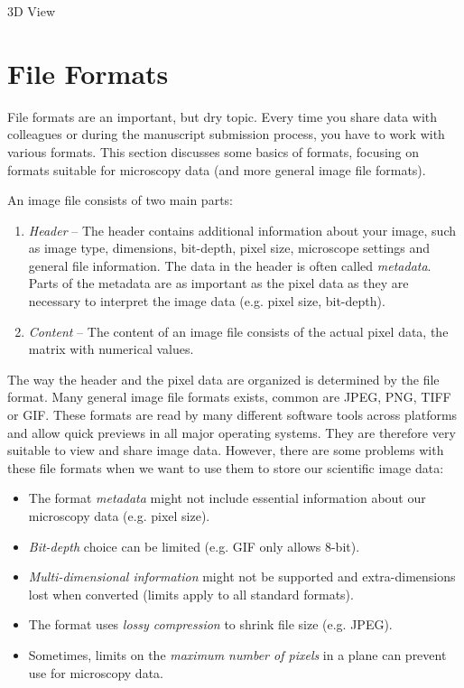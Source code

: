 \begin{taskbox}{3D View}
\end{taskbox}

\section{File Formats}
File formats are an important, but dry topic. Every time you share data with colleagues or during the manuscript submission process, you have to work with various formats. This section discusses some basics of formats, focusing on formats suitable for microscopy data (and more general image file formats).

An image file consists of two main parts:
\begin{enumerate}
	\item \emph{Header} -- The header contains additional information about your image, such as image type, dimensions, bit-depth, pixel size, microscope settings and general file information. The data in the header is often called \emph{metadata}. Parts of the metadata are as important as the pixel data as they are necessary to interpret the image data (e.g. pixel size, bit-depth). 
	\item \emph{Content} -- The content of an image file consists of the actual pixel data, the matrix with numerical values. 
\end{enumerate}

The way the header and the pixel data are organized is determined by the file format. Many general image file formats exists, common are JPEG, PNG, TIFF or GIF. These formats are read by many different software tools across platforms and allow quick previews in all major operating systems. They are therefore very suitable to view and share image data. However, there are some problems with these file formats when we want to use them to store our scientific image data:
\begin{itemize}
	\item The format \emph{metadata} might not include essential information about our microscopy data (e.g. pixel size).
	\item \emph{Bit-depth} choice can be limited (e.g. GIF only allows 8-bit).
	\item \emph{Multi-dimensional information} might not be supported and extra-dimensions lost when converted (limits apply to all standard formats).
	\item The format uses \emph{lossy compression} to shrink file size (e.g. JPEG).
	\item Sometimes, limits on the \emph{maximum number of pixels} in a plane can prevent use for microscopy data.
\end{itemize}

